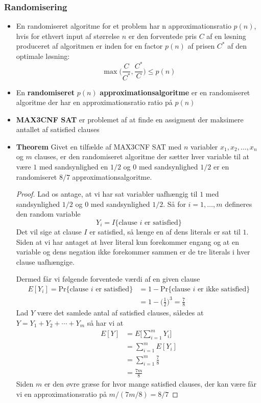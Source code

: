 \subsubsection{Randomisering}
\begin{itemize}
	\item En randomiseret algoritme for et problem har n approximationsratio $p(n)$, hvis for ethvert input af størrelse $n$ er den forventede pris $C$ af en løsning produceret af algoritmen er inden for en factor $p(n)$ af prisen $C^*$ af den optimale løsning:
  \begin{equation*}
    \max\bigg(\frac{C}{C^*},\frac{C^*}{C}\bigg) \leq p(n)
  \end{equation*}
  \item En \textbf{randomiseret} $p(n)$ \textbf{approximationsalgoritme} er en randomiseret algoritme der har en approximationsratio ratio på $p(n)$ 
  \item \textbf{MAX3CNF SAT} er problemet af at finde en assigment der maksimere antallet af satisfied clauses 
  \item \textbf{Theorem} Givet en tilfælde af MAX3CNF SAT med $n$ variabler $x_1, x_2, \dots, x_n$ og $m$ clauses, er den randomiseret algoritme der sætter hver variable til at være $1$ med sandsynlighed en $1/2$ og $0$ med sandsynlighed $1/2$ er en randomiseret $8/7$ approximationsalgoritme.
  \begin{proof} 
    Lad os antage, at vi har sat variabler uafhængig til $1$ med sandsynlighed $1/2$ og $0$ med sandsynlighed $1/2$. Så for $i=1,\dots,m$ defineres den random variable 
  \begin{equation*}
    Y_i = I\{\text{clause $i$ er satisfied}\}
  \end{equation*}  
  Det vil sige at clause $I$ er satisfied, så længe en af dens literals er sat til $1$. Siden at vi har antaget at hver literal kun forekommer engang og at en variable og dens negation ikke forekommer sammen er de tre literals i hver clause uafhængige. \smallskip

  Dermed får vi følgende forventede værdi af en given clause
  \begin{align*}
    E[Y_i] = \text{Pr}\{\text{clause $i$ er satisfied}\} &= 1- \text{Pr}\{\text{clause $i$ er ikke satisfied}\} \\
                                                         &= 1- \bigg(\frac12 \bigg)^3 = \frac78
  \end{align*}
  Lad $Y$ være det samlede antal af satisfied clauses, således at $Y = Y_1 + Y_2 + \cdots + Y_m$ så har vi at
  \begin{align*}
    E[Y] &= E\bigg [ \sum_{i=1}^m Y_ i\bigg] \\
         &= \sum_{i=1}^m E[Y_i] \\
         &= \sum_{i=1}^m \frac78 \\
         & = \frac{7m}8
  \end{align*}
  Siden $m$ er den øvre græse for hvor mange satisfied clauses, der kan være får vi en approximationsratio på $m/(7m/8)=8/7$  

  \end{proof}
\end{itemize}

